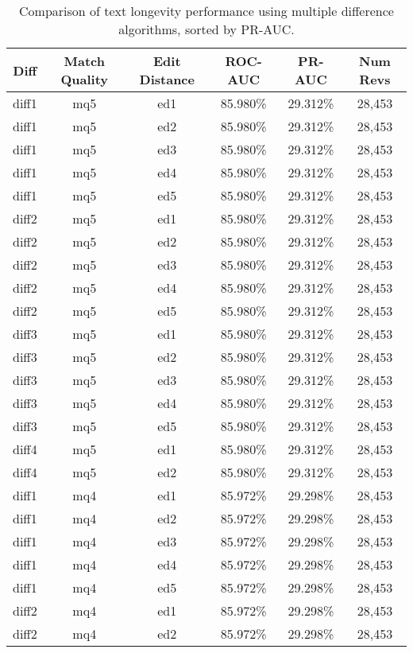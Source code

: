 \begin{table}[tbph]
\begin{center}
\begin{tabular}{|c|c|c||c|c|c|}
\hline
Diff & Match Quality & Edit Distance & ROC-AUC & PR-AUC & Num Revs \\
\hline
\hline
diff1 & mq5 & ed1 & 85.980\% & 29.312\% & 28,453 \\
diff1 & mq5 & ed2 & 85.980\% & 29.312\% & 28,453 \\
diff1 & mq5 & ed3 & 85.980\% & 29.312\% & 28,453 \\
diff1 & mq5 & ed4 & 85.980\% & 29.312\% & 28,453 \\
diff1 & mq5 & ed5 & 85.980\% & 29.312\% & 28,453 \\
diff2 & mq5 & ed1 & 85.980\% & 29.312\% & 28,453 \\
diff2 & mq5 & ed2 & 85.980\% & 29.312\% & 28,453 \\
diff2 & mq5 & ed3 & 85.980\% & 29.312\% & 28,453 \\
diff2 & mq5 & ed4 & 85.980\% & 29.312\% & 28,453 \\
diff2 & mq5 & ed5 & 85.980\% & 29.312\% & 28,453 \\
diff3 & mq5 & ed1 & 85.980\% & 29.312\% & 28,453 \\
diff3 & mq5 & ed2 & 85.980\% & 29.312\% & 28,453 \\
diff3 & mq5 & ed3 & 85.980\% & 29.312\% & 28,453 \\
diff3 & mq5 & ed4 & 85.980\% & 29.312\% & 28,453 \\
diff3 & mq5 & ed5 & 85.980\% & 29.312\% & 28,453 \\
diff4 & mq5 & ed1 & 85.980\% & 29.312\% & 28,453 \\
diff4 & mq5 & ed2 & 85.980\% & 29.312\% & 28,453 \\
diff1 & mq4 & ed1 & 85.972\% & 29.298\% & 28,453 \\
diff1 & mq4 & ed2 & 85.972\% & 29.298\% & 28,453 \\
diff1 & mq4 & ed3 & 85.972\% & 29.298\% & 28,453 \\
diff1 & mq4 & ed4 & 85.972\% & 29.298\% & 28,453 \\
diff1 & mq4 & ed5 & 85.972\% & 29.298\% & 28,453 \\
diff2 & mq4 & ed1 & 85.972\% & 29.298\% & 28,453 \\
diff2 & mq4 & ed2 & 85.972\% & 29.298\% & 28,453 \\
\hline
\end{tabular}
\end{center}
\caption{Comparison of text longevity performance using
    multiple difference algorithms, sorted by PR-AUC.}
\label{tab:textshout}
\end{table}
